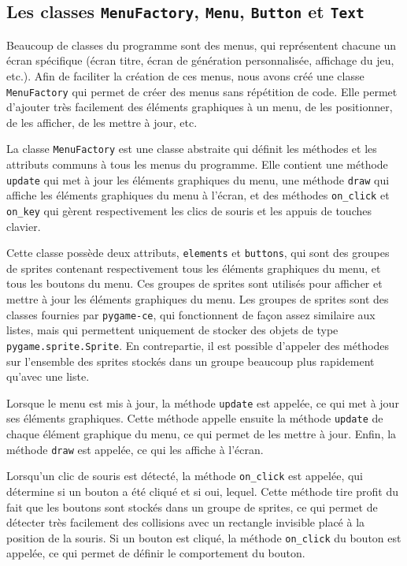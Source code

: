 \documentclass[12pt]{scrreprt} %
\begin{document}
\subsection{Les classes \texttt{MenuFactory}, \texttt{Menu}, \texttt{Button} et \texttt{Text}}

Beaucoup de classes du programme sont des menus, qui représentent chacune un écran spécifique (écran titre, écran de génération personnalisée, affichage du jeu, etc.). Afin de faciliter la création de ces menus, nous avons créé une classe \texttt{MenuFactory} qui permet de créer des menus sans répétition de code. Elle permet d'ajouter très facilement des éléments graphiques à un menu, de les positionner, de les afficher, de les mettre à jour, etc.


La classe \texttt{MenuFactory} est une classe abstraite qui définit les méthodes et les attributs communs à tous les menus du programme. Elle contient une méthode \texttt{update} qui met à jour les éléments graphiques du menu, une méthode \texttt{draw} qui affiche les éléments graphiques du menu à l'écran, et des méthodes \texttt{on\_click} et \texttt{on\_key} qui gèrent respectivement les clics de souris et les appuis de touches clavier.

Cette classe possède deux attributs, \texttt{elements} et \texttt{buttons}, qui sont des groupes de sprites contenant respectivement tous les éléments graphiques du menu, et tous les boutons du menu. Ces groupes de sprites sont utilisés pour afficher et mettre à jour les éléments graphiques du menu. Les groupes de sprites sont des classes fournies par \texttt{pygame-ce}, qui fonctionnent de façon assez similaire aux listes, mais qui permettent uniquement de stocker des objets de type \texttt{pygame.sprite.Sprite}. En contrepartie, il est possible d'appeler des méthodes sur l'ensemble des sprites stockés dans un groupe beaucoup plus rapidement qu'avec une liste.

Lorsque le menu est mis à jour, la méthode \texttt{update} est appelée, ce qui met à jour ses éléments graphiques. Cette méthode appelle ensuite la méthode \texttt{update} de chaque élément graphique du menu, ce qui permet de les mettre à jour. Enfin, la méthode \texttt{draw} est appelée, ce qui les affiche à l'écran.

Lorsqu'un clic de souris est détecté, la méthode \texttt{on\_click} est appelée, qui détermine si un bouton a été cliqué et si oui, lequel. Cette méthode tire profit du fait que les boutons sont stockés dans un groupe de sprites, ce qui permet de détecter très facilement des collisions avec un rectangle invisible placé à la position de la souris. Si un bouton est cliqué, la méthode \texttt{on\_click} du bouton est appelée, ce qui permet de définir le comportement du bouton.
\end{document}
